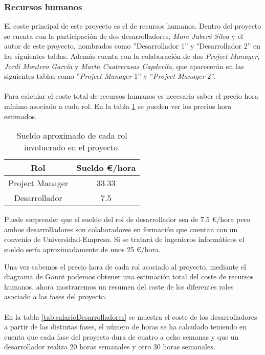 \subsubsection{Recursos humanos}
El coste principal de este proyecto es el de recursos humanos. Dentro del proyecto se cuenta con la participación de dos desarrolladores, \textit{Marc Juberó Silva} y el autor de este proyecto, nombrados como ''Desarrollador 1'' y "Desarrollador 2'' en las siguientes tablas. Además cuenta con la colaboración de dos \textit{Project Manager}, \textit{Jordi Montero García} y \textit{Marta Cuatrecasas Capdevila}, que aparecerán en las siguientes tablas como ''\textit{Project Manager} 1'' y ''\textit{Project Manager} 2''.  \\\\
Para calcular el coste total de recursos humanos es necesario saber el precio hora mínimo asociado a cada rol. En la tabla \ref{tab:salarioRol} se pueden ver los precios hora estimados.

\begin{table}[h]
\begin{center}
\begin{tabular}{|c|c|}
\hline
\rowcolor[HTML]{C0C0C0} 
\textbf{Rol}     & \textbf{Sueldo \euro /hora} \\ \hline
Project Manager  & 33.33                      \\ \hline
Desarrollador    & 7.5                      \\ \hline
\end{tabular}
\end{center}
\caption{Sueldo aproximado de cada rol involucrado en el proyecto. \label{tab:salarioRol}}
\end{table}

Puede sorprender que el sueldo del rol de desarrollador sea de 7.5 \euro/hora pero ambos desarrolladores son colaboradores en formación que cuentan con un convenio de Universidad-Empresa. Si se tratará de ingenieros informáticos el sueldo sería aproximadamente de unos 25 \euro/hora.

Una vez sabemos el precio hora de cada rol asociado al proyecto, mediante el diagrama de Gannt podemos obtener una estimación total del coste de recursos humanos, ahora mostraremos un resumen del coste de los diferentes roles asociado a las fases del proyecto.
\\\\
En la tabla \ref{tab:salarioDesarrolladores} se muestra el coste de los desarrolladores a partir de las distintas fases, el número de horas se ha calculado teniendo en cuenta que cada fase del proyecto dura de cuatro a ocho semanas y que un desarrollador realiza 20 horas semanales y otro 30 horas semanales.


